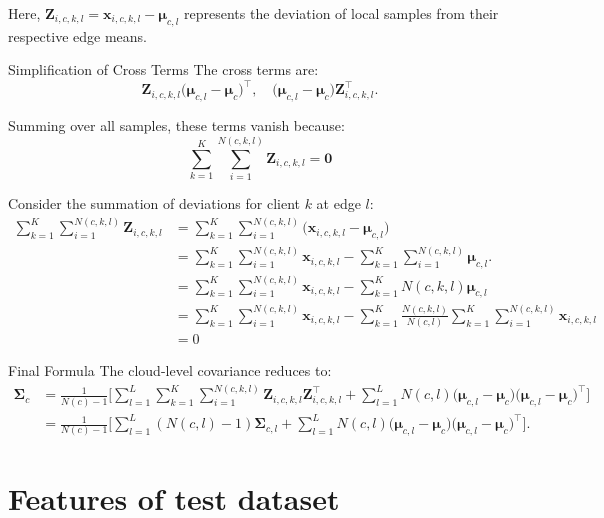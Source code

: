 \documentclass[journal]{IEEEtran}
\begin{document}
Here, \( \mathbf{Z}_{i,c,k,l} = \mathbf{x}_{i,c,k,l} - \mathbf{\mu}_{c,l} \) represents the deviation of local samples from their respective edge means.

Simplification of Cross Terms
The cross terms are:
\begin{equation}
\mathbf{Z}_{i,c,k,l} \big( \mathbf{\mu}_{c,l} - \mathbf{\mu}_c \big)^\top, \quad
\big( \mathbf{\mu}_{c,l} - \mathbf{\mu}_c \big) \mathbf{Z}_{i,c,k,l}^\top.
\end{equation}

Summing over all samples, these terms vanish because:
\begin{equation}
  \sum_{k=1}^K \sum_{i=1}^{N(c,k,l)} \mathbf{Z}_{i,c,k,l} = \mathbf{0}
\end{equation}

Consider the summation of deviations for client \( k \) at edge \( l \):
\begin{align*}
\sum_{k=1}^K\sum_{i=1}^{N(c,k,l)} \mathbf{Z}_{i,c,k,l} &= \sum_{k=1}^K \sum_{i=1}^{N(c,k,l)} \big( \mathbf{x}_{i,c,k,l} - \mathbf{\mu}_{c,l} \big) \\
&= \sum_{k=1}^K\sum_{i=1}^{N(c,k,l)} \mathbf{x}_{i,c,k,l} - \sum_{k=1}^K\sum_{i=1}^{N(c,k,l)} \mathbf{\mu}_{c,l}. \\
&= \sum_{k=1}^K\sum_{i=1}^{N(c,k,l)} \mathbf{x}_{i,c,k,l} - \sum_{k=1}^K N(c,k,l) \mathbf{\mu}_{c,l} \\
&= \sum_{k=1}^K\sum_{i=1}^{N(c,k,l)} \mathbf{x}_{i,c,k,l} - \sum_{k=1}^K\frac{N(c,k,l)}{N(c,l)} \sum_{k=1}^K \sum_{i=1}^{N(c,k,l)} \mathbf{x}_{i,c,k,l} \\
&= 0
\end{align*}



Final Formula
The cloud-level covariance reduces to:
\begin{align}
\mathbf{\Sigma}_c &= \frac{1}{N(c)-1} \Bigg[
\sum_{l=1}^L \sum_{k=1}^K \sum_{i=1}^{N(c,k,l)} \mathbf{Z}_{i,c,k,l} \mathbf{Z}_{i,c,k,l}^\top + 
\sum_{l=1}^L N(c,l) \big( \mathbf{\mu}_{c,l} - \mathbf{\mu}_c \big) \big( \mathbf{\mu}_{c,l} - \mathbf{\mu}_c \big)^\top
\Bigg] \nonumber \\
&= \frac{1}{N(c)-1} \Bigg[
\sum_{l=1}^L (N(c,l)-1) \mathbf{\Sigma}_{c,l} + 
\sum_{l=1}^L N(c,l) \big( \mathbf{\mu}_{c,l} - \mathbf{\mu}_c \big) \big( \mathbf{\mu}_{c,l} - \mathbf{\mu}_c \big)^\top
\Bigg].
\end{align}


\section{Features of test dataset}
\end{document}
